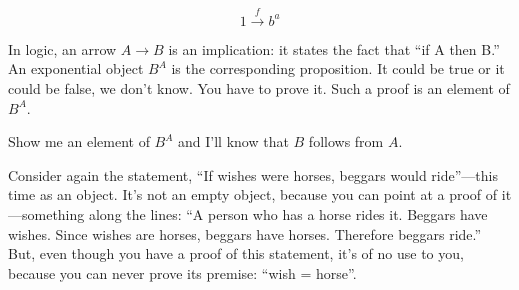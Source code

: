 \documentclass[DaoFP]{subfiles}
\begin{document}
\[ 1 \xrightarrow f b^a\]

In logic, an arrow $ A \to B$ is an implication: it states the fact that ``if A then B.'' An exponential object $ B^A$ is the corresponding proposition. It could be true or it could be false, we don't know. You have to prove it. Such a proof is an element of $ B^A$. 

Show me an element of $ B^A$ and I'll know that $ B$ follows from $ A$.

Consider again the statement, ``If wishes were horses, beggars would ride''---this time as an object. It's not an empty object, because you can point at a proof of it---something along the lines: ``A person who has a horse rides it. Beggars have wishes. Since wishes are horses, beggars have horses. Therefore beggars ride.'' But, even though you have a proof of this statement, it's of no use to you, because you can never prove its premise: ``wish = horse''. 
\end{document}
